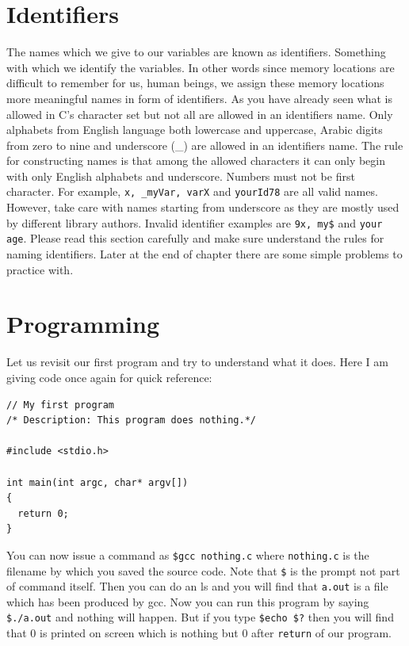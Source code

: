 \section{Identifiers}
The names which we give to our variables are known as identifiers. Something 
with which we identify the variables. In other words since memory locations are
difficult to remember for us, human beings, we assign these memory locations
more meaningful names in form of identifiers. As you have already seen what is
allowed  in C's character set but not all are allowed in an identifiers
name. Only alphabets from English language both lowercase and uppercase,
Arabic digits from zero to nine and underscore (\_) are allowed in an
identifiers name. The rule for constructing names is that among the allowed
characters it can only begin with only English alphabets and
underscore. Numbers must not be first character. For example, \texttt{x,
  \_myVar, varX} and \texttt{yourId78} are all valid names. However, take care
with names starting from underscore as they are mostly used by different
library authors. Invalid identifier examples are \texttt{9x, my\$} and
\texttt{your age}. Please read this section carefully and make sure understand
the rules for naming identifiers. Later at the end of chapter there are some
simple problems to practice with.

\section{Programming}
Let us revisit our first program and try to understand what it does. Here I am 
giving code once again for quick reference:

\begin{Verbatim}[frame=single]
// My first program
/* Description: This program does nothing.*/

#include <stdio.h>

int main(int argc, char* argv[])
{
  return 0;
}
\end{Verbatim}

You can now issue a command as \texttt{\$gcc nothing.c} where 
\texttt{nothing.c} is the filename by which you saved the source code. Note 
that \texttt{\$} is the prompt not part of command itself. Then you can do an 
ls and you will find that \texttt{a.out} is a file which has been produced by 
gcc. Now you can run this program by saying \texttt{\$./a.out} and nothing 
will happen. But if you type \texttt{\$echo \$?} then you will find that 0 is 
printed on screen which is nothing but 0 after \texttt{return} of our program.

